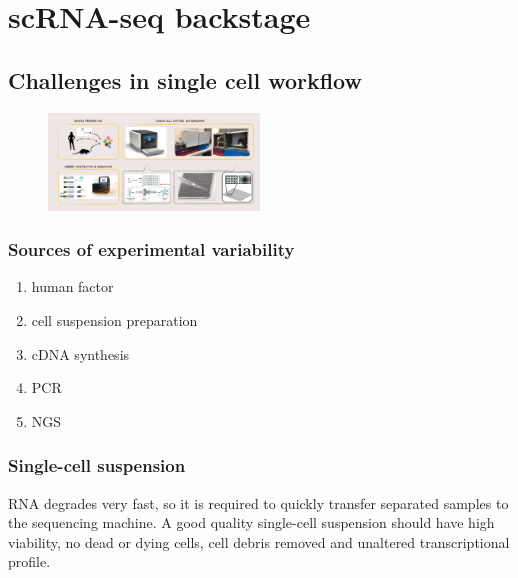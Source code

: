 \graphicspath{{chapters/02/}}
\chapter{scRNA-seq backstage}


\hypertarget{challenges-in-single-cell-workflow}{%
\section{Challenges in single cell
workflow}\label{challenges-in-single-cell-workflow}}

\begin{figure}
\centering
\includegraphics[width=0.5\textwidth]{images/Screenshot.png}
\caption{}
\end{figure}

\hypertarget{sources-of-experimental-variability}{%
\subsection{Sources of experimental
variability}\label{sources-of-experimental-variability}}

\begin{enumerate}
\def\labelenumi{\arabic{enumi}.}
\tightlist
\item
  human factor
\item
  cell suspension preparation
\item
  cDNA synthesis
\item
  PCR
\item
  NGS
\end{enumerate}

\hypertarget{single-cell-suspension}{%
\subsection{Single-cell suspension}\label{single-cell-suspension}}

RNA degrades very fast, so it is required to quickly transfer separated
samples to the sequencing machine. A good quality single-cell suspension
should have high viability, no dead or dying cells, cell debris removed
and unaltered transcriptional profile.

